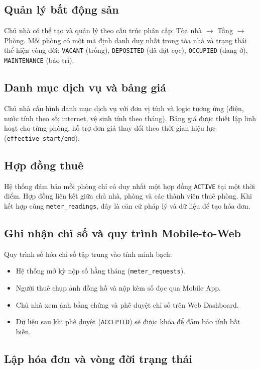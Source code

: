 \subsection{Quản lý bất động sản}

Chủ nhà có thể tạo và quản lý theo cấu trúc phân cấp: Tòa nhà $\rightarrow$ Tầng $\rightarrow$ Phòng. Mỗi phòng có một mã định danh duy nhất trong tòa nhà và trạng thái thể hiện vòng đời: \texttt{VACANT} (trống), \texttt{DEPOSITED} (đã đặt cọc), \texttt{OCCUPIED} (đang ở), \texttt{MAINTENANCE} (bảo trì).

\subsection{Danh mục dịch vụ và bảng giá}

Chủ nhà cấu hình danh mục dịch vụ với đơn vị tính và logic tương ứng (điện, nước tính theo số; internet, vệ sinh tính theo tháng). Bảng giá được thiết lập linh hoạt cho từng phòng, hỗ trợ đơn giá thay đổi theo thời gian hiệu lực (\texttt{effective\_start/end}).

\subsection{Hợp đồng thuê}

Hệ thống đảm bảo mỗi phòng chỉ có duy nhất một hợp đồng \texttt{ACTIVE} tại một thời điểm. Hợp đồng liên kết giữa chủ nhà, phòng và các thành viên thuê phòng. Khi kết hợp cùng \texttt{meter\_readings}, đây là căn cứ pháp lý và dữ liệu để tạo hóa đơn.

\subsection{Ghi nhận chỉ số và quy trình Mobile-to-Web}

Quy trình số hóa chỉ số tập trung vào tính minh bạch:
\begin{itemize}
    \item Hệ thống mở kỳ nộp số hằng tháng (\texttt{meter\_requests}).
    \item Người thuê chụp ảnh đồng hồ và nộp kèm số đọc qua Mobile App.
    \item Chủ nhà xem ảnh bằng chứng và phê duyệt chỉ số trên Web Dashboard.
    \item Dữ liệu sau khi phê duyệt (\texttt{ACCEPTED}) sẽ được khóa để đảm bảo tính bất biến.
\end{itemize}

\subsection{Lập hóa đơn và vòng đời trạng thái}

